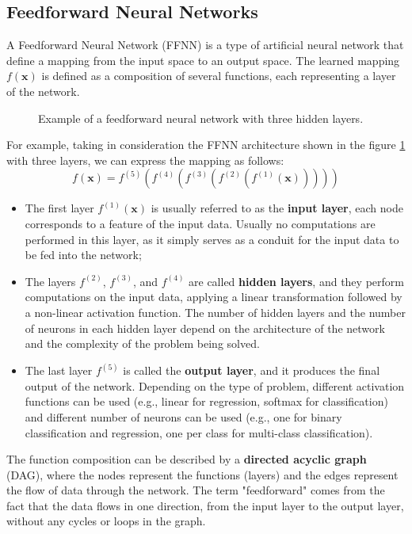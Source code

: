 \subsection{Feedforward Neural Networks}
A Feedforward Neural Network (FFNN) is a type of artificial neural network that define a mapping from the input space
to an output space. The learned mapping $f(\boldsymbol{x})$ is defined as a composition of several functions, each representing a layer of the network.
\begin{figure}[H]
    \centering
    \scalebox{0.8}{
        
    }
    \caption{Example of a feedforward neural network with three hidden layers.}
    \label{fig:FFNN_example}
\end{figure}

For example, taking in consideration the FFNN architecture shown in the figure \ref{fig:FFNN_example} with three layers, we can express the mapping as follows:
\begin{equation*}
    f(\boldsymbol{x}) = f^{(5)}(f^{(4)}(f^{(3)}(f^{(2)}(f^{(1)}(\boldsymbol{x})))))
\end{equation*}
\begin{itemize}
    \item The first layer $f^{(1)}(\boldsymbol{x})$ is usually referred to as the \textbf{input layer}, each node corresponds to a feature of the input data. Usually no
    computations are performed in this layer, as it simply serves as a conduit for the input data to be fed into the network;
    \item The layers $f^{(2)}$, $f^{(3)}$, and $f^{(4)}$ are called \textbf{hidden layers}, and they perform computations on the input data, applying a linear transformation followed by a non-linear activation function.
    The number of hidden layers and the number of neurons in each hidden layer depend on the architecture of the network and the complexity of the problem being solved.
    \item The last layer $f^{(5)}$ is called the \textbf{output layer}, and it produces the final output of the network. Depending on the type of problem,
    different activation functions can be used (e.g., linear for regression, softmax for classification)
    and different number of neurons can be used (e.g., one for binary classification and regression, one per class for multi-class classification).
\end{itemize}
The function composition can be described by a \textbf{directed acyclic graph} (DAG), where the nodes represent the functions (layers) and the edges represent the flow of data through the network. 
The term "feedforward" comes from the fact that the data flows in one direction, from the input layer to the output layer, without any cycles or loops in the graph.

